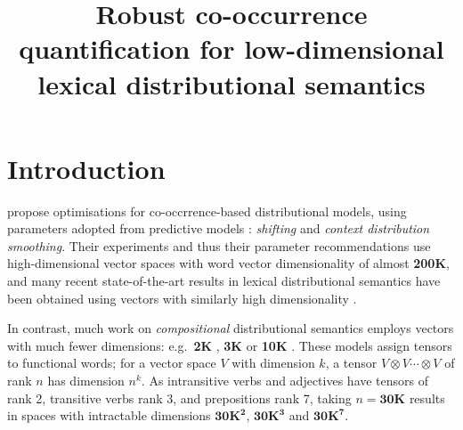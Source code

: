 \documentclass[11pt]{article}
\title{Robust co-occurrence quantification for low-dimensional lexical distributional semantics}
\date{}
\begin{document}
\def\emnlp/{\textit{KS2013}}
\def\PhraseRel/{PhraseRel}

\def\PMI/{$1 \operatorname{PMI}$}
\def\SPMI/{$1 \operatorname{SPMI}$}
\def\CPMI/{$1 \operatorname{CPMI}$}
\def\SCPMI/{$1 \operatorname{SCPMI}$}

\def\NPMI/{$n \operatorname{PMI}$}
\def\NSPMI/{$n \operatorname{SPMI}$}
\def\NCPMI/{$n \operatorname{CPMI}$}
\def\NSCPMI/{$n \operatorname{SCPMI}$}

\def\logNPMI/{$\log n\operatorname{PMI}$}
\def\logNSPMI/{$\log n\operatorname{SPMI}$}
\def\logNCPMI/{$\log n \operatorname{CPMI}$}
\def\logNSCPMI/{$\log n \operatorname{SCPMI}$}

\maketitle
\begin{abstract}

\end{abstract}

\section{Introduction}
\label{sec:introduction}

 propose optimisations for co-occrrence-based distributional models, using parameters adopted from predictive models \cite{mikolov2013efficient}: \emph{shifting} and \emph{context distribution smoothing}. Their experiments and thus their parameter  recommendations use high-dimensional vector spaces with word vector dimensionality of almost \textbf{200K}, and many recent state-of-the-art results in lexical distributional semantics have been obtained using vectors with similarly high dimensionality  \cite{baroni-dinu-kruszewski:2014:P14-1,kiela-clark:2014:CVSC,lapesa2014large}.

In contrast, much work on \emph{compositional} distributional semantics employs vectors with much fewer dimensions: e.g.~\textbf{2K} \cite{Grefenstette:2011:ESC:2145432.2145580,kartsadrqpl2014,milajevs-EtAl:2014:EMNLP2014}, \textbf{3K} \cite{Dinu:2010:MDS:1870658.1870771,milajevs-purver:2014:CVSC} or \textbf{10K} \cite{polajnar-clark:2014:EACL,Baroni2010nouns}. These models  assign tensors to functional words; for a vector space $V$ with dimension $k$,  a tensor $V \otimes V \cdots \otimes V$ of rank $n$ has dimension  $n^k$. As intransitive verbs and adjectives have  tensors of rank 2,  transitive verbs  rank 3, and prepositions rank 7, 
taking $n= \textbf{30K}$ results in spaces with intractable dimensions  $\textbf{30K}^\textbf{2}$, $\textbf{30K}^\textbf{3}$ and $\textbf{30K}^\textbf{7}$. 
\end{document}
